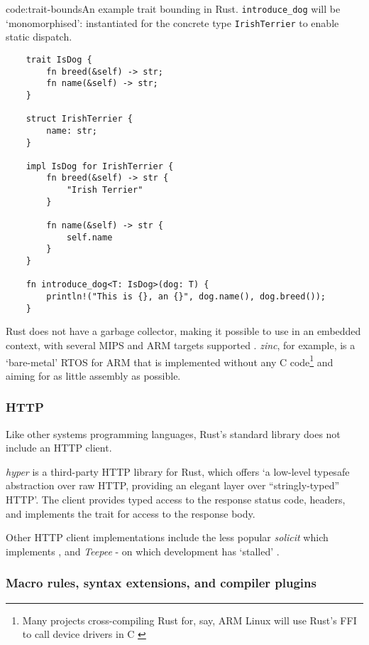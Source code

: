 \begin{codelisting}{code:trait-bounds}{An example trait bounding in Rust. \texttt{introduce_dog} will be `monomorphised': instantiated for the concrete type \texttt{IrishTerrier} to enable static dispatch.}
\begin{verbatim}
	trait IsDog {
		fn breed(&self) -> str;
		fn name(&self) -> str;
	}

	struct IrishTerrier {
		name: str;
	}

	impl IsDog for IrishTerrier {
		fn breed(&self) -> str {
			"Irish Terrier"
		}

		fn name(&self) -> str {
			self.name
		}
	}

	fn introduce_dog<T: IsDog>(dog: T) {
		println!("This is {}, an {}", dog.name(), dog.breed());
	}
\end{verbatim}
\end{codelisting}

Rust does not have a garbage collector, making it possible to use in an embedded context, with several MIPS and ARM targets supported \cite{rust_platforms}. \emph{zinc}, \cite{rust_rtos_zinc} for example, is a `bare-metal' RTOS for ARM that is implemented without any C code\footnote{Many projects cross-compiling Rust for, say, ARM Linux will use Rust's FFI to call device drivers in C \cite{rust_baremetal}} and aiming for as little assembly as possible.

\subsubsection{HTTP}\label{rust-http}
Like other systems programming languages, Rust's standard library does not include an HTTP client.

\emph{hyper} is a third-party HTTP library for Rust, which offers `a low-level typesafe abstraction over raw HTTP, providing an elegant layer over ``stringly-typed'' HTTP'. The client provides typed access to the response status code, headers, and implements the  trait for access to the response body. \cite{rust_http_hyper}

Other HTTP client implementations include the less popular \emph{solicit} \cite{rust_http_solicit} which implements , and \emph{Teepee} - on which development has `stalled' \cite{rust_http_teepee}.

\subsubsection{Macro rules, syntax extensions, and compiler plugins}\label{rust-plugins}

